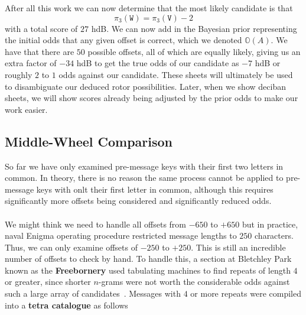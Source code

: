 \noindent After all this work we can now determine that the most
likely candidate is that
\[
  \pi_3(\texttt{W}) = \pi_3(\texttt{V}) - 2
\]
with a total score of $27$ hdB. We can now add in the Bayesian
prior representing the initial odds that any given offset is
correct, which we denoted $\mathbb{O}(A)$. We have that there are
$50$ possible offsets, all of which are equally likely, giving us
an extra factor of $-34$ hdB to get the true odds of our candidate
as $-7$ hdB or roughly $2$ to $1$ odds against our candidate. These
sheets will ultimately be used to disambiguate our deduced rotor
possibilities. Later, when we show deciban sheets, we will show
scores already being adjusted by the prior odds to make our work easier.

\subsection{Middle-Wheel Comparison}
So far we have only examined pre-message keys with their first two
letters in common. In theory, there is no reason the same process
cannot be applied to pre-message keys with onlt their first letter in
common, although this requires significantly more offsets being
considered and significantly reduced odds.
\\\\We might think we need to handle all offsets from $-650$ to
$+650$ but in practice, naval Enigma operating procedure restricted
message lengths to $250$ characters. Thus, we can only examine
offsets of $-250$ to $+250$. This is still an incredible number of
offsets to check by hand. To handle this, a section at Bletchley
Park known as the {\bf{Freebornery}} used tabulating machines to
find repeats of length $4$ or greater, since shorter $n$-grams were
not worth the considerable odds against such a large array of
candidates~\cite[pp.~102--103]{Alexander1945}. Messages with $4$ or more repeats were compiled into a
{\bf{tetra catalogue}} as follows

